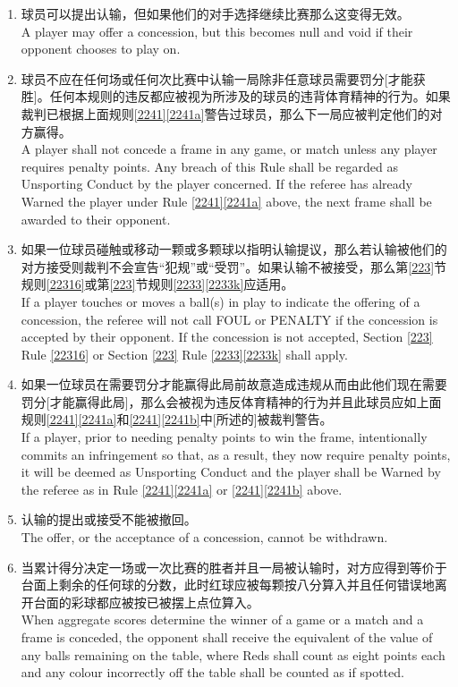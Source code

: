 \begin{enumerate}[label=(\alph*)]
    \item 球员可以提出认输，但如果他们的对手选择继续比赛那么这变得无效。\\
    A player may offer a concession, but this becomes null and void if their opponent chooses to play on.
    \item 球员不应在任何场或任何次比赛中认输一局除非任意球员需要罚分[才能获胜]。任何本规则的违反都应被视为所涉及的球员的违背体育精神的行为。如果裁判已根据上面规则\ref{2241}\ref{2241a}警告过球员，那么下一局应被判定他们的对方赢得。\\
    A player shall not concede a frame in any game, or match unless any player requires penalty points. Any breach of this Rule shall be regarded as Unsporting Conduct by the player concerned. If the referee has already Warned the player under Rule \ref{2241}\ref{2241a} above, the next frame shall be awarded to their opponent.
    \item \label{2242c}如果一位球员碰触或移动一颗或多颗球以指明认输提议，那么若认输被他们的对方接受则裁判不会宣告``犯规''或``受罚''。如果认输不被接受，那么第\ref{223}节规则\ref{22316}或第\ref{223}节规则\ref{2233}\ref{2233k}应适用。\\
    If a player touches or moves a ball(s) in play to indicate the offering of a concession, the referee will not call FOUL or PENALTY if the concession is accepted by their opponent. If the concession is not accepted, Section \ref{223} Rule \ref{22316} or Section \ref{223} Rule \ref{2233}\ref{2233k} shall apply.
    \item 如果一位球员在需要罚分才能赢得此局前故意造成违规从而由此他们现在需要罚分[才能赢得此局]，那么会被视为违反体育精神的行为并且此球员应如上面规则\ref{2241}\ref{2241a}和\ref{2241}\ref{2241b}中[所述的]被裁判警告。\\
    If a player, prior to needing penalty points to win the frame, intentionally commits an infringement so that, as a result, they now require penalty points, it will be deemed as Unsporting Conduct and the player shall be Warned by the referee as in Rule \ref{2241}\ref{2241a} or \ref{2241}\ref{2241b} above.
    \item 认输的提出或接受不能被撤回。\\
    The offer, or the acceptance of a concession, cannot be withdrawn.
    \item 当累计得分决定一场或一次比赛的胜者并且一局被认输时，对方应得到等价于台面上剩余的任何球的分数，此时红球应被每颗按八分算入并且任何错误地离开台面的彩球都应被按已被摆上点位算入。\\
    When aggregate scores determine the winner of a game or a match and a frame is conceded, the opponent shall receive the equivalent of the value of any balls remaining on the table, where Reds shall count as eight points each and any colour incorrectly off the table shall be counted as if spotted.
\end{enumerate}

